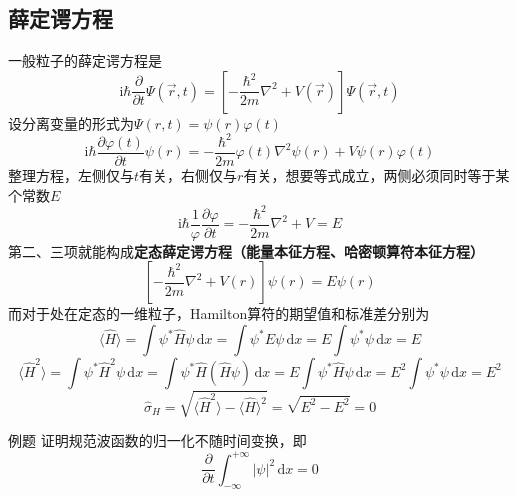 \subsection{薛定谔方程}
一般粒子的薛定谔方程是
$$
    \mathrm{i}\hbar\frac{\partial }{\partial t}\Psi(\vec{r}, t) = \left[-\frac{\hbar^2}{2m}\nabla^2 + V(\vec{r})\right]\Psi(\vec{r}, t)
$$
设分离变量的形式为$\Psi(r,t)=\psi(r)\varphi(t)$
$$
    \mathrm{i}\hbar\frac{\partial \varphi(t)}{\partial t}\psi(r) = -\frac{\hbar^2}{2m}\varphi(t)\nabla^2\psi(r) + V\psi(r)\varphi(t)
$$
整理方程，左侧仅与$t$有关，右侧仅与$r$有关，想要等式成立，两侧必须同时等于某个常数$E$
$$
    \mathrm{i}\hbar\frac{1}{\varphi}\frac{\partial \varphi}{\partial t} = -\frac{\hbar^2}{2m}\nabla^2 + V = E
$$
第二、三项就能构成\textbf{定态薛定谔方程（能量本征方程、哈密顿算符本征方程）}
$$
    \left[-\frac{\hbar^2}{2m}\nabla^2 + V(r)\right]\psi(r) = E\psi(r)
$$
而对于处在定态的一维粒子，Hamilton算符的期望值和标准差分别为
$$
    \langle\hat{H}\rangle=\int\psi^*\hat{H}\psi\,\mathrm{d}x=\int\psi^*E\psi\,\mathrm{d}x=E\int\psi^*\psi\,\mathrm{d}x=E
$$
$$
    \langle\hat{H}^2\rangle
    =\int\psi^*\hat{H}^2\psi\,\mathrm{d}x
    =\int\psi^*\hat{H}(\hat{H}\psi)\,\mathrm{d}x
    =E\int\psi^*\hat{H}\psi\,\mathrm{d}x
    =E^2\int\psi^*\psi\,\mathrm{d}x
    =E^2
$$
$$
    \hat{\sigma}_{H}
    =\sqrt{\langle\hat{H}^2\rangle-\langle\hat{H}\rangle^2}
    =\sqrt{E^2-E^2}
    =0
$$
\begin{question}{例题}
    证明规范波函数的归一化不随时间变换，即
    $$
        \frac{\partial }{\partial t}\int_{-\infty}^{+\infty}|\psi|^2 \,\mathrm{d}x=0
    $$
\end{question}

